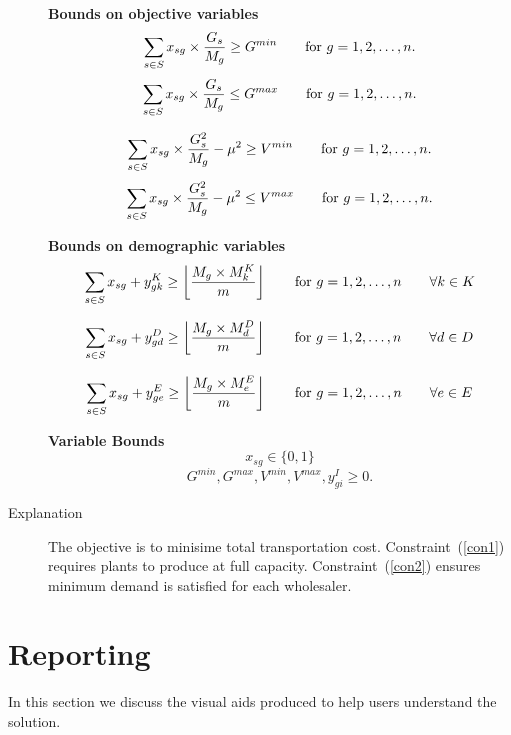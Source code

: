 \documentclass[12pt]{ORSNZ}
\begin{document}
\begin{description}
\textbf{Bounds on objective variables}
\begin{equation} \label{con2}
\sum_{s \in S} x_{sg}\times \frac{G_s}{M_g} \geq G^{min} \qquad \mbox{for $ g = 1, 2, \ldots, n$.}
\end{equation}
\begin{equation} \label{con2}
\sum_{s \in S} x_{sg}\times \frac{G_s}{M_g} \leq G^{max} \qquad \mbox{for $ g = 1, 2, \ldots, n$.}
\end{equation}

\begin{equation} \label{con2}
\sum_{s \in S} x_{sg}\times \frac{G_s^2}{M_g}  - \mu^2 \geq V^{min} \qquad \mbox{for $ g = 1, 2, \ldots, n$.}
\end{equation}
\begin{equation} \label{con2}
\sum_{s \in S} x_{sg}\times \frac{G_s^2}{M_g}  - \mu^2 \leq V^{max} \qquad \mbox{for $ g = 1, 2, \ldots, n$.}
\end{equation}


\textbf{Bounds on demographic variables}
\begin{equation} \label{con2}
\sum_{s \in S} x_{sg} + y^K_{gk} \geq \left\lfloor\frac{M_g\times M^K_k}{m}\right\rfloor \qquad \mbox{for $ g = 1, 2, \ldots, n$\qquad $\forall k \in K$}
\end{equation}

\begin{equation} \label{con2}
\sum_{s \in S} x_{sg} + y^D_{gd}  \geq \left\lfloor\frac{M_g\times M^D_d}{m}\right\rfloor \qquad \mbox{for $ g = 1, 2, \ldots, n$\qquad $\forall d \in D$}
\end{equation}

\begin{equation} \label{con2}
\sum_{s \in S} x_{sg} + y^E_{ge}  \geq \left\lfloor\frac{M_g\times M^E_e}{m}\right\rfloor \qquad \mbox{for $ g = 1, 2, \ldots, n$\qquad $\forall e \in E$}
\end{equation}

\textbf{Variable Bounds}
\[x_{sg} \in \{0, 1\}\]
\[G^{min}, G^{max}, V^{min}, V^{max}, y^I_{gi}  \ge 0.\]

\item[Explanation] The objective is to minisime total transportation
cost. Constraint~(\ref{con1}) requires plants to produce at full
capacity. Constraint~(\ref{con2}) ensures minimum demand is satisfied
for each wholesaler.
\end{description}

\section{Reporting}
	In this section we discuss the visual aids produced to help users understand the solution.
\end{document}
